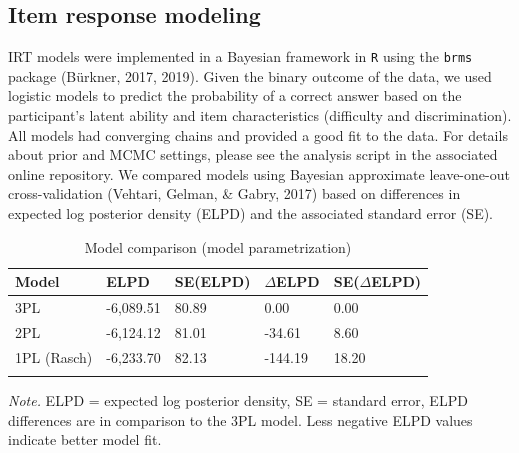 \documentclass[
  man,floatsintext]{apa6}
\begin{document}
\hypertarget{item-response-modeling}{%
\subsection{Item response modeling}\label{item-response-modeling}}

IRT models were implemented in a Bayesian framework in \texttt{R} using the \texttt{brms} package (Bürkner, 2017, 2019). Given the binary outcome of the data, we used logistic models to predict the probability of a correct answer based on the participant's latent ability and item characteristics (difficulty and discrimination). All models had converging chains and provided a good fit to the data. For details about prior and MCMC settings, please see the analysis script in the associated online repository. We compared models using Bayesian approximate leave-one-out cross-validation (Vehtari, Gelman, \& Gabry, 2017) based on differences in expected log posterior density (ELPD) and the associated standard error (SE).

\begin{table}[tbp]

\begin{center}
\begin{threeparttable}

\caption{\label{tab:tab1}Model comparison (model parametrization)}

\begin{tabular}{lllll}
\toprule
Model & ELPD & SE(ELPD) & $\Delta$ELPD & SE($\Delta$ELPD)\\
\midrule
3PL & -6,089.51 & 80.89 & 0.00 & 0.00\\
2PL & -6,124.12 & 81.01 & -34.61 & 8.60\\
1PL (Rasch) & -6,233.70 & 82.13 & -144.19 & 18.20\\
\bottomrule
\addlinespace
\end{tabular}

\begin{tablenotes}[para]
\normalsize{\textit{Note.} ELPD = expected log posterior density, SE = standard error, ELPD differences are in comparison to the 3PL model. Less negative ELPD values indicate better model fit.}
\end{tablenotes}

\end{threeparttable}
\end{center}

\end{table}
\end{document}
